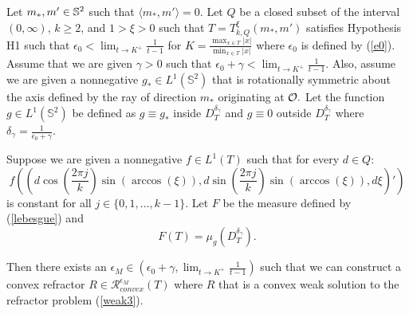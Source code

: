 \documentclass[review]{elsarticle}
\begin{document}
\begin{prop}\label{cov-poly}
    Let $m_*,m'\in \mathbb{S}^2$ such that $\langle m_*,m'\rangle=0$. Let $Q$ be a closed subset of the interval $(0,\infty)$, $k\ge 2$, and $1>\xi>0$ such that $T=T_{k,Q}^\xi(m_*,m')$ satisfies Hypothesis H1 such that $\epsilon_0<\lim_{t\to K^+}\frac{1}{t-1}$ for $K=\frac{\max_{x\in T} |x|}{\min_{x\in T} |x|}$ where $\epsilon_0$ is defined by (\ref{e0}).  Assume that we are given $\gamma>0$ such that $\epsilon_0+\gamma<\lim_{t\to K^+}\frac{1}{t-1}$. Also, assume we are given a nonnegative $g_*\in L^1(\mathbb{S}^2)$ that is rotationally symmetric about the axis defined by the ray of direction $m_*$ originating at $\mathcal{O}.$ Let the function $g\in L^1(\mathbb{S}^2)$ be defined as $g\equiv g_*$ inside $D_T^{\delta_\gamma}$ and $g\equiv 0$ outside $D_T^{\delta_\gamma}$ where $\delta_\gamma=\frac1{\epsilon_0+\gamma}$. 

    Suppose we are given a nonnegative $f\in L^1(T)$ such that for every $d\in Q$:
    \begin{equation}
        f\left(\left(d\cos\left(\frac{2\pi j}k\right)\sin\left(\arccos(\xi)\right),d\sin\left(\frac{2\pi j}k\right)\sin\left(\arccos(\xi)\right),d\xi\right)'\right)
    \end{equation}
    is constant for all $j\in \{0,1,\dots,k-1\}$. Let $F$ be the measure defined by (\ref{lebesgue}) and
    \begin{equation}
    F(T) = \mu_{g}(D_T^{\delta_\gamma}).
\end{equation}

Then there exists an $\epsilon_M\in(\epsilon_0+\gamma,\lim_{t\to K^+}\frac{1}{t-1})$ such that we can construct a convex refractor $R  \in \mathcal{R}_{convex}^{\epsilon_M} (T)$ where $R$ that is a convex weak solution to the refractor problem (\ref{weak3}).    
\end{prop}
\end{document}
